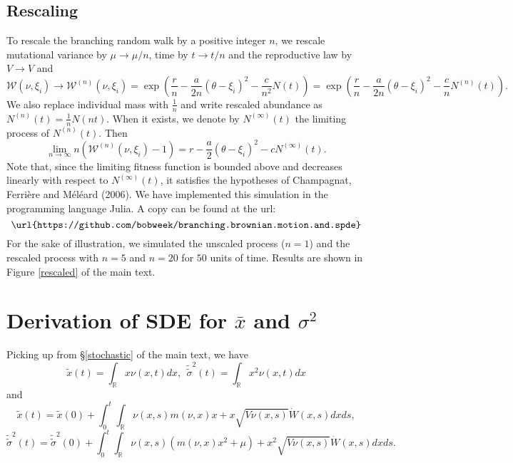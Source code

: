 \documentclass[]{article}
\begin{document}
\hypertarget{rescaling}{%
\subsection{Rescaling}\label{rescaling}}

To rescale the branching random walk by a positive integer \(n\), we
rescale mutational variance by \(\mu\to \mu/n\), time by \(t\to t/n\)
and the reproductive law by \(V\to V\) and \begin{equation}
\mathscr W(\nu,\xi_i)\to\mathscr W^{(n)}(\nu,\xi_i)=\exp\left(\frac{r}{n}-\frac{a}{2n}(\theta-\xi_i)^2-\frac{c}{n^2}N(t)\right)=\exp\left(\frac{r}{n}-\frac{a}{2n}(\theta-\xi_i)^2-\frac{c}{n}N^{(n)}(t)\right).
\end{equation} We also replace individual mass with \(\frac{1}{n}\) and
write rescaled abundance as \(N^{(n)}(t)=\frac{1}{n}N(nt)\). When it
exists, we denote by \(N^{(\infty)}(t)\) the limiting process of
\(N^{(n)}(t)\). Then \begin{equation}
\lim_{n\to\infty}n\left(\mathscr W^{(n)}(\nu,\xi_i)-1\right)=r-\frac{a}{2}(\theta-\xi_i)^2-cN^{(\infty)}(t).
\end{equation} Note that, since the limiting fitness function is bounded
above and decreases linearly with respect to \(N^{(\infty)}(t)\), it
satisfies the hypotheses of Champagnat, Ferrière and Méléard (2006). We
have implemented this simulation in the programming language Julia. A
copy can be found at the url:
\[\texttt{\url{https://github.com/bobweek/branching.brownian.motion.and.spde}}\]
For the sake of illustration, we simulated the unscaled process
(\(n=1\)) and the rescaled process with \(n=5\) and \(n=20\) for \(50\)
units of time. Results are shown in Figure \ref{rescaled} of the main
text.

\hypertarget{derivation-of-sde-for-bar-x-and-sigma2}{%
\section{\texorpdfstring{Derivation of SDE for \(\bar x\) and
\(\sigma^2\)
\label{SDE_DERIV}}{Derivation of SDE for \textbackslash{}bar x and \textbackslash{}sigma\^{}2 }}\label{derivation-of-sde-for-bar-x-and-sigma2}}

Picking up from \S\ref{stochastic} of the main text, we have
\begin{equation}
\tilde x(t)=\int_\mathbb{R}x\nu(x,t)dx, \ \ \tilde{\tilde\sigma}^2(t)=\int_\mathbb{R}x^2\nu(x,t)dx
\end{equation} and \begin{equation}\label{xtilde}
\tilde x(t)=\tilde x(0)+\int_0^t\int_\mathbb{R}\nu(x,s)m(\nu,x)x+x\sqrt{V\nu(x,s)}\dot W(x,s)dxds,
\end{equation} \begin{equation}\label{stilde}
\tilde{\tilde\sigma}^2(t)=\tilde{\tilde\sigma}^2(0)+\int_0^t\int_\mathbb{R}\nu(x,s)\left(m(\nu,x)x^2+\mu\right)+x^2\sqrt{V\nu(x,s)}\dot W(x,s)dxds.
\end{equation}
\end{document}
